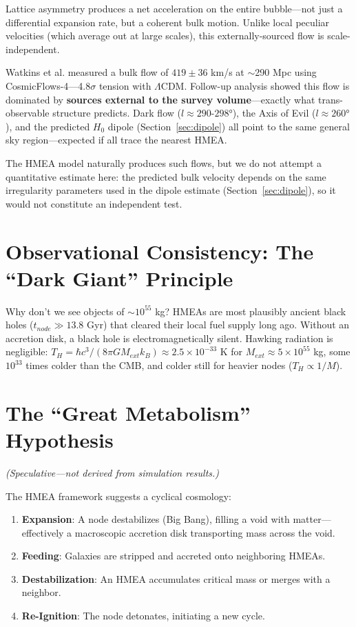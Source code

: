 \documentclass{article}
\begin{document}
Lattice asymmetry produces a net acceleration on the entire bubble—not just a differential expansion rate, but a coherent bulk motion.
Unlike local peculiar velocities (which average out at large scales), this externally-sourced flow is scale-independent.

Watkins et al. \cite{Watkins2023} measured a bulk flow of $419 \pm 36$ km/s at $\sim$290 Mpc using CosmicFlows-4—4.8$\sigma$ tension with $\Lambda$CDM.
Follow-up analysis \cite{Watkins2025} showed this flow is dominated by \textbf{sources external to the survey volume}—exactly what trans-observable structure predicts.
Dark flow ($l \approx 290$-$298°$), the Axis of Evil ($l \approx 260°$), and the predicted $H_0$ dipole (Section~\ref{sec:dipole}) all point to the same general sky region—expected if all trace the nearest HMEA.

The HMEA model naturally produces such flows, but we do not attempt a quantitative estimate here: the predicted bulk velocity depends on the same irregularity parameters used in the dipole estimate (Section~\ref{sec:dipole}), so it would not constitute an independent test.

\section{Observational Consistency: The ``Dark Giant'' Principle}
\label{sec:defenses}
Why don't we see objects of $\sim 10^{55}$ kg?
HMEAs are most plausibly ancient black holes ($t_{node} \gg 13.8$ Gyr) that cleared their local fuel supply long ago.
Without an accretion disk, a black hole is electromagnetically silent.
Hawking radiation is negligible: $T_H = \hbar c^3/(8\pi G M_{ext} k_B) \approx 2.5 \times 10^{-33}$ K for $M_{ext} \approx 5 \times 10^{55}$ kg, some $10^{33}$ times colder than the CMB, and colder still for heavier nodes ($T_H \propto 1/M$).

\section{The ``Great Metabolism'' Hypothesis}
\label{sec:metabolism}
\textit{(Speculative---not derived from simulation results.)}

The HMEA framework suggests a cyclical cosmology:
\begin{enumerate}
\item \textbf{Expansion}: A node destabilizes (Big Bang), filling a void with matter—effectively a macroscopic accretion disk transporting mass across the void.
\item \textbf{Feeding}: Galaxies are stripped and accreted onto neighboring HMEAs.
\item \textbf{Destabilization}: An HMEA accumulates critical mass or merges with a neighbor.
\item \textbf{Re-Ignition}: The node detonates, initiating a new cycle.
\end{enumerate}
\end{document}

